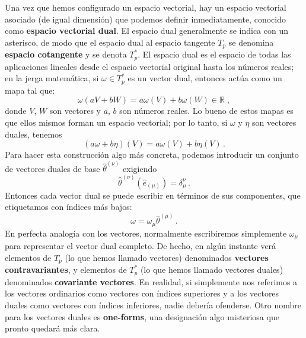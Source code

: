 \documentclass[11pt,b5paper,openany,twoside]{book}
\newcommand{\e}[1]{\hat{e}_{(#1)}}
\newcommand{\ztheta}[1]{{\hat{\theta}}^{(#1)}}
\begin{document}
Una vez que hemos configurado un espacio vectorial, hay un espacio vectorial asociado (de igual dimensión) que podemos definir inmediatamente, conocido como {\bf espacio vectorial dual}.
El espacio dual generalmente se indica con un asterisco, de modo que el espacio dual al espacio tangente $T_p$ se denomina {\bf espacio cotangente} y se denota $T^*_p$.
El espacio dual es el espacio de todas las aplicaciones lineales desde el espacio vectorial original hasta los números reales; en la jerga matemática, si $\omega\in T_p^*$ es un vector dual, entonces actúa como un mapa tal que:
\begin{equation}
\omega(aV+bW) = a\omega(V) + b\omega(W) \in \mathbb{R}\; ,\label{1.31}
\end{equation}
donde $V$, $W$ son vectores y $a$, $b$ son números reales.
Lo bueno de estos mapas es que ellos mismos forman un espacio vectorial; por lo tanto, si $\omega$ y $\eta$ son vectores duales, tenemos
\begin{equation}
(a\omega+b\eta)(V) = a\omega(V) + b\eta(V)\,.\label{1.32}
\end{equation}
Para hacer esta construcción algo más concreta, podemos introducir un conjunto de vectores duales de base $\ztheta{\nu}$ exigiendo
\begin{equation}
\ztheta{\nu}(\e{\mu}) = \delta^{\nu}_{\mu}\, . \label{1.33}
\end{equation}
Entonces cada vector dual se puede escribir en términos de sus componentes, que etiquetamos con índices más bajos:
\begin{equation}
\omega = \omega_\mu \ztheta{\mu}\,.\label{1.34}
\end{equation}
En perfecta analogía con los vectores, normalmente escribiremos simplemente $\omega_\mu$ para representar el vector dual completo.
De hecho, en algún instante verá elementos de $T_p$ (lo que hemos llamado vectores) denominados {\bf vectores contravariantes}, y elementos de $T_p^*$ (lo que hemos llamado vectores duales) denominados {\bf covariante vectores}.
En realidad, si simplemente nos referimos a los vectores ordinarios como vectores con índices superiores y a los vectores duales como vectores con índices inferiores, nadie debería ofenderse.
Otro nombre para los vectores duales es {\bf one-forms}, una designación algo misteriosa que pronto quedará más clara.
\end{document}
